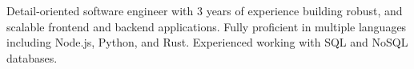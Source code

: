 

\begin{cvparagraph}

Detail-oriented software engineer with 3 years of experience building robust, and scalable frontend and backend applications. Fully proficient in multiple languages including Node.js, Python, and Rust. Experienced working with SQL and NoSQL databases.

\end{cvparagraph}
